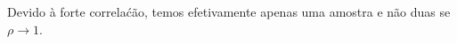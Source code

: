 \begin{exenumerate}
\begin{solution}
        Devido \`a forte correla\'c\~ao, temos efetivamente apenas uma amostra e n\~ao duas se $\rho \to 1$.
        
    \end{solution}
    
\end{exenumerate}